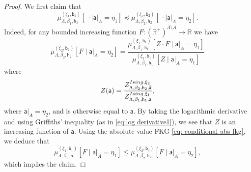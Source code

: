 \documentclass[11pt,a4paper]{article}
\theoremstyle{definition}
\numberwithin{equation}{section}
\begin{document}
\begin{proof}
We first claim that 
\begin{equation}
\mu_{\Lambda,\beta_1,\mathsf h_1}^{(\xi_1,\mathsf{b}_1)}[\:\cdot \mid \mathsf{a}|_A=\eta_1] \preccurlyeq \mu_{\Lambda,\beta_2,\mathsf h_2}^{(\xi_2,\mathsf{b}_2)}[\:\cdot \mid \mathsf{a}|_A=\eta_2].    
\end{equation} 
Indeed, for any bounded increasing function $F:(\mathbb{R}^{+})^{\overline{\Lambda}\setminus A}\rightarrow \mathbb{R}$ we have
\begin{equation} 
\mu_{\Lambda,\beta_2,\mathsf h_2}^{(\xi_2,\mathsf{b}_2)}[F\mid \mathsf{a}|_A=\eta_2]
=
\frac{\mu_{\Lambda,\beta_1,\mathsf h_1}^{(\xi_1,\mathsf{b}_1)}[Z\cdot F\mid \mathsf{a}|_A=\eta_1]}{\mu_{\Lambda,\beta_1,\mathsf h_1}^{(\xi_1,\mathsf{b}_1)}[Z\mid \mathsf{a}|_A=\eta_1]}
\end{equation}
where
\begin{equation}
Z(\mathsf{a})
=
\frac{Z^{\textup{Ising},\xi_2}_{\Lambda,\beta_2,\mathsf{h}_2,\overline{\mathsf{a}}}}{Z^{\textup{Ising},\xi_1}_{\Lambda,\beta_1,\mathsf{h}_1,\mathsf{a}}},
\end{equation}
where $\overline{\mathsf{a}}|_A=\eta_2$, and is otherwise equal to $\mathsf{a}$.
By taking the logarithmic derivative and using Griffiths' inequality (as in \eqref{eq:log derivative1}), we see that $Z$ is an increasing function of $\mathsf{a}$. Using the absolute value FKG \eqref{eq: conditional abs fkg}, we deduce that 
\begin{equation} 
\mu_{\Lambda,\beta_1,\mathsf h_1}^{(\xi_1,\mathsf{b}_1)}[F\mid \mathsf{a}|_A=\eta_1]
\leq
\mu_{\Lambda,\beta_2,\mathsf h_2}^{(\xi_2,\mathsf{b}_2)}[F\mid \mathsf{a}|_A=\eta_2],
\end{equation}
which implies the claim.


\end{proof}
\end{document}
